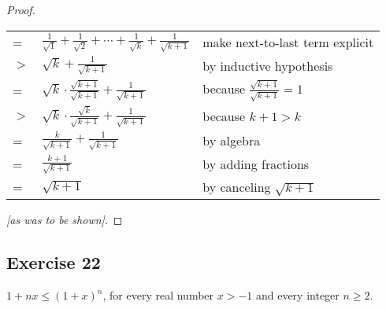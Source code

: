 \documentclass[14pt]{extarticle}
\newcommand{\dps}{\displaystyle}
\newcommand{\cy}{\color{cyan}}
\begin{document}
\begin{proof}
    \begin{center}
        \begin{tabular}{lll}
            =   & $\dps \frac{1}{\sqrt{1}} + \frac{1}{\sqrt{2}} + \cdots + \frac{1}{\sqrt{k}} + \frac{1}{\sqrt{k+1}}$ & {\cy make next-to-last term explicit}                 \\
            $>$ & $\dps \sqrt{k} + \frac{1}{\sqrt{k+1}}$                                                              & {\cy by inductive hypothesis}                         \\
            =   & $\dps \sqrt{k} \cdot \frac{\sqrt{k + 1}}{\sqrt{k + 1}} + \frac{1}{\sqrt{k+1}}$                      & {\cy because $\frac{\sqrt{k + 1}}{\sqrt{k + 1}} = 1$} \\
            $>$ & $\dps \sqrt{k} \cdot \frac{\sqrt{k}}{\sqrt{k + 1}} + \frac{1}{\sqrt{k+1}}$                          & {\cy because $k + 1 > k$}                             \\
            =   & $\dps \frac{k}{\sqrt{k + 1}} + \frac{1}{\sqrt{k+1}}$                                                & {\cy by algebra}                                      \\
            =   & $\dps \frac{k+1}{\sqrt{k + 1}}$                                                                     & {\cy by adding fractions}                             \\
            =   & $\dps \sqrt{k + 1}$                                                                                 & {\cy by canceling $\sqrt{k+1}$}
        \end{tabular}
    \end{center}

    {\it [as was to be shown]}.
\end{proof}

\subsection{Exercise 22}
$1 + nx \leq (1 + x)^n$, for every real number $x > -1$
and every integer $n \geq 2$.
\end{document}
